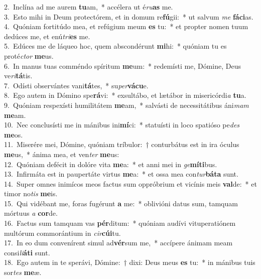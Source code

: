 {2.~}Inclína ad me aurem \textbf{tu}am,~* accélera ut é\textit{ru}\textbf{as} me.\\
{3.~}Esto mihi in Deum protectórem, et in domum re\textbf{fú}gii:~* ut salvum \textit{me} \textbf{fá}\textbf{ci}as.\\
{4.~}Quóniam fortitúdo mea, et refúgium meum \textbf{es} tu:~* et propter nomen tuum dedúces me, et enú\textit{tri}\textbf{es} me.\\
{5.~}Edúces me de láqueo hoc, quem abscondérunt \textbf{mi}hi:~* quóniam tu es proté\textit{ctor} \textbf{me}us.\\
{6.~}In manus tuas comméndo spíritum \textbf{me}um:~* redemísti me, Dómine, Deus ve\textit{ri}\textbf{tá}tis.\\
{7.~}Odísti observántes vani\textbf{tá}tes,~* su\textit{per}\textbf{vá}\textbf{cu}e.\\
{8.~}Ego autem in Dómino spe\textbf{rá}vi:~* exsultábo, et lætábor in misericórdi\textit{a} \textbf{tu}a.\\
{9.~}Quóniam respexísti humilitátem \textbf{me}am,~* salvásti de necessitátibus áni\textit{mam} \textbf{me}am.\\
{10.~}Nec conclusísti me in mánibus ini\textbf{mí}ci:~* statuísti in loco spatióso pe\textit{des} \textbf{me}os.\\
{11.~}Miserére mei, Dómine, quóniam tríbulor:~† conturbátus est in ira óculus \textbf{me}us,~* ánima mea, et ven\textit{ter} \textbf{me}us:\\
{12.~}Quóniam defécit in dolóre vita \textbf{me}a:~* et anni mei in \textit{ge}\textbf{mí}\textbf{ti}bus.\\
{13.~}Infirmáta est in paupertáte virtus \textbf{me}a:~* et ossa mea con\textit{tur}\textbf{bá}\textbf{ta} sunt.\\
{14.~}Super omnes inimícos meos factus sum oppróbrium et vicínis meis \textbf{val}de:~* et timor no\textit{tis} \textbf{me}is.\\
{15.~}Qui vidébant me, foras fugérunt \textbf{a} me:~* oblivióni datus sum, tamquam mórtuus \textit{a} \textbf{cor}de.\\
{16.~}Factus sum tamquam vas \textbf{pér}ditum:~* quóniam audívi vituperatiónem multórum commorántium in \textit{cir}\textbf{cú}\textbf{i}tu.\\
{17.~}In eo dum convenírent simul ad\textbf{vér}sum me,~* accípere ánimam meam consi\textit{li}\textbf{á}\textbf{ti} sunt.\\
{18.~}Ego autem in te sperávi, Dómine:~† dixi: Deus meus \textbf{es} tu:~* in mánibus tuis sor\textit{tes} \textbf{me}æ.\\
